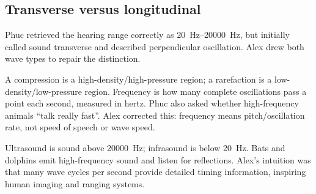 \documentclass[11pt,a4paper]{article}
\begin{document}
\subsection{Transverse versus longitudinal}
Phuc retrieved the hearing range correctly as \SIrange{20}{20000}{\hertz}, but initially called sound transverse and described perpendicular oscillation. Alex drew both wave types to repair the distinction.

\begin{center}
\end{center}

A compression is a high-density/high-pressure region; a rarefaction is a low-density/low-pressure region. Frequency is how many complete oscillations pass a point each second, measured in hertz. Phuc also asked whether high-frequency animals ``talk really fast''. Alex corrected this: frequency means pitch/oscillation rate, not speed of speech or wave speed.

Ultrasound is sound above \SI{20000}{\hertz}; infrasound is below \SI{20}{\hertz}. Bats and dolphins emit high-frequency sound and listen for reflections. Alex's intuition was that many wave cycles per second provide detailed timing information, inspiring human imaging and ranging systems.
\end{document}
